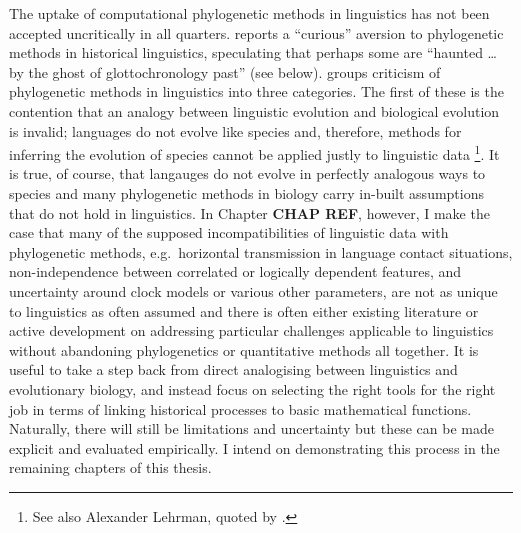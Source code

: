 The uptake of computational phylogenetic methods in linguistics has not been accepted uncritically in all quarters. \textcite[p.~520]{atkinson_curious_2005} reports a ``curious'' aversion to phylogenetic methods in historical linguistics, speculating that perhaps some are ``haunted \ldots{} by the ghost of glottochronology past'' (see below). \textcite{bowern_computational_2018} groups criticism of phylogenetic methods in linguistics into three categories. The first of these is the contention that an analogy between linguistic evolution and biological evolution is invalid; languages do not evolve like species and, therefore, methods for inferring the evolution of species cannot be applied justly to linguistic data \autocites{andersen_synchrony_2006}{blench_new_2015}\footnote{See also Alexander Lehrman, quoted by \textcite[p.~1326]{balter_search_2004}.}. It is true, of course, that langauges do not evolve in perfectly analogous ways to species and many phylogenetic methods in biology carry in-built assumptions that do not hold in linguistics. In Chapter \textbf{CHAP REF}, however, I make the case that many of the supposed incompatibilities of linguistic data with phylogenetic methods, e.g.~horizontal transmission in language contact situations, non-independence between correlated or logically dependent features, and uncertainty around clock models or various other parameters, are not as unique to linguistics as often assumed and there is often either existing literature or active development on addressing particular challenges applicable to linguistics without abandoning phylogenetics or quantitative methods all together. It is useful to take a step back from direct analogising between linguistics and evolutionary biology, and instead focus on selecting the right tools for the right job in terms of linking historical processes to basic mathematical functions. Naturally, there will still be limitations and uncertainty but these can be made explicit and evaluated empirically. I intend on demonstrating this process in the remaining chapters of this thesis.

